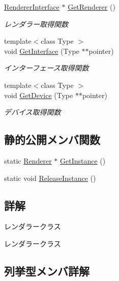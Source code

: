 \begin{DoxyCompactItemize}
\mbox{\hyperlink{class_renderer_interface}{Renderer\+Interface}} $\ast$ \mbox{\hyperlink{class_renderer_a4ee43ba8d87142ff334ae7016cae9050}{Get\+Renderer}} ()
\begin{DoxyCompactList}\small\item\em レンダラー取得関数 \end{DoxyCompactList}\item 
{\footnotesize template$<$class Type $>$ }\\void \mbox{\hyperlink{class_renderer_a15585698849fcba4722ac0f00b8b62e6}{Get\+Interface}} (Type $\ast$$\ast$pointer)
\begin{DoxyCompactList}\small\item\em インターフェース取得関数 \end{DoxyCompactList}\item 
{\footnotesize template$<$class Type $>$ }\\void \mbox{\hyperlink{class_renderer_a6610c3a85a8170141c4584cecf4a6d15}{Get\+Device}} (Type $\ast$$\ast$pointer)
\begin{DoxyCompactList}\small\item\em デバイス取得関数 \end{DoxyCompactList}\end{DoxyCompactItemize}
\subsection*{静的公開メンバ関数}
\begin{DoxyCompactItemize}
\item 
static \mbox{\hyperlink{class_renderer}{Renderer}} $\ast$ \mbox{\hyperlink{class_renderer_a8c287bd7009d4717336ab1a9e1a556bd}{Get\+Instance}} ()
\item 
static void \mbox{\hyperlink{class_renderer_aa7ac523172faaf376ecddaed4bdc0781}{Release\+Instance}} ()
\end{DoxyCompactItemize}


\subsection{詳解}
レンダラークラス 

レンダラークラス 

\subsection{列挙型メンバ詳解}
\mbox{\label{class_renderer_ab5a9379ccadcf2b3394c61cf8c835fec}} 
